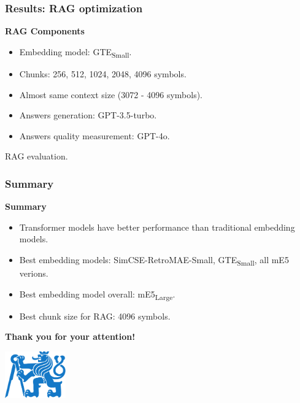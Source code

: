 \documentclass{beamer}
\newif\ifplacelogo
\begin{document}
\begin{frame}
  \frametitle{Results: RAG optimization}
  \textcolor{cvut_navy}{\textbf{RAG Components}}
  \begin{itemize}
    \item Embedding model: GTE\textsubscript{Small}.
    \item Chunks: 256, 512, 1024, 2048, 4096 symbols.
    \item Almost same context size (3072 - 4096 symbols).
    \item Answers generation: GPT-3.5-turbo.
    \item Answers quality measurement: GPT-4o.
  \end{itemize}
  
  \begin{table}
    
    \caption{RAG evaluation.}
  \end{table}
\end{frame}


\placelogofalse 
\begin{frame}
  \frametitle{Summary}
  \textcolor{cvut_navy}{\textbf{Summary}}
  \begin{itemize}
    \item Transformer models have better performance than traditional embedding models.    
    \item Best embedding models: SimCSE-RetroMAE-Small, GTE\textsubscript{Small}, all mE5 verions.
    \item Best embedding model overall: mE5\textsubscript{Large}.
    \item Best chunk size for RAG: 4096 symbols.
  \end{itemize}
  \vspace{10px}
  \begin{center}
    \huge \textcolor{cvut_navy}{\textbf{Thank you for your attention!}}  
  \end{center}
  \vspace{10px}
  \begin{center}
    \includegraphics[height=2cm]{src/fig/pdfs/ctu_logo_blue_filled.pdf}
  \end{center}
\end{frame}
\end{document}

